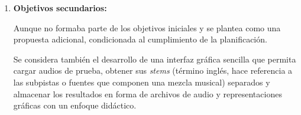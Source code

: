 \begin{enumerate}[
    label=\textbf{\arabic*.},
    leftmargin=*,
    itemsep=0.5em,
    topsep=0.5em,
    start=2
]
    \item \textbf{Objetivos secundarios:}

    Aunque no formaba parte de los objetivos iniciales y se plantea como una
    propuesta adicional, condicionada al cumplimiento de la planificación.

     
    Se considera también el desarrollo de una interfaz gráfica sencilla que permita cargar audios de prueba, obtener sus
    \textit{stems} (término inglés, hace referencia
    a las subpistas o fuentes que componen una mezcla musical) separados y
    almacenar los resultados en forma de archivos de audio y representaciones
    gráficas con un enfoque didáctico.
\end{enumerate}